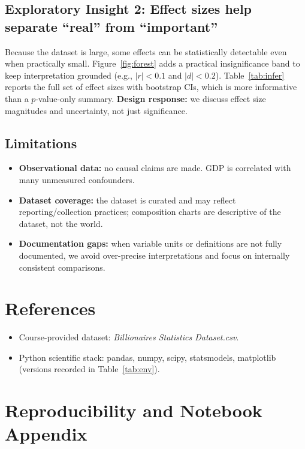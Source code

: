 \documentclass[a4paper,10pt]{article}
\begin{document}
\subsection{Exploratory Insight 2: Effect sizes help separate ``real'' from ``important''}

Because the dataset is large, some effects can be statistically detectable even when practically small.
Figure~\ref{fig:forest} adds a practical insignificance band to keep interpretation grounded (e.g., $|r|<0.1$ and $|d|<0.2$).
Table~\ref{tab:infer} reports the full set of effect sizes with bootstrap CIs, which is more informative than a $p$-value-only summary.
\textbf{Design response:} we discuss effect size magnitudes and uncertainty, not just significance.

\subsection{Limitations}

\begin{itemize}
  \item \textbf{Observational data:} no causal claims are made. GDP is correlated with many unmeasured confounders.
  \item \textbf{Dataset coverage:} the dataset is curated and may reflect reporting/collection practices; composition charts are descriptive of the dataset, not the world.
  \item \textbf{Documentation gaps:} when variable units or definitions are not fully documented, we avoid over-precise interpretations and focus on internally consistent comparisons.
\end{itemize}

\section{References}

\begin{itemize}
  \item Course-provided dataset: \textit{Billionaires Statistics Dataset.csv}.
  \item Python scientific stack: pandas, numpy, scipy, statsmodels, matplotlib (versions recorded in Table~\ref{tab:env}).
\end{itemize}

\appendix
\section{Reproducibility and Notebook Appendix}
\end{document}
